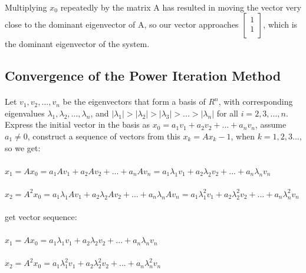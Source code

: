 \documentclass[12pt]{article}
\begin{document}
\paragraph{}Multiplying $x_0$ repeatedly by the matrix A has resulted in moving the vector very close to the dominant eigenvector of A, so our vector approaches $\begin{bmatrix}1\\1 \\\end{bmatrix}$, which is the dominant eigenvector of the system.

\subsection{Convergence of the Power Iteration Method}
\paragraph{}Let $v_1, v_2,..., v_n$ be the eigenvectors that form a basis of $R^n$, with corresponding eigenvalues $\lambda_1, \lambda_2, ..., \lambda_n$, and $|\lambda_1|>|\lambda_2|>|\lambda_3|>...>|\lambda_n|$ for all $i=2,3,...,n$. Express the initial vector in the basis as $x_0 = a_1v_1 + a_2v_2+ ... +a_nv_n$, assume $a_1\neq0$, construct a sequence of vectors from this $x_k = Ax_k-1$, when $k=1,2,3...$, so we get:
\paragraph{} $x_1 = Ax_0 = a_1Av_1 + a_2Av_2 + ... + a_nAv_n = a_1\lambda_1v_1 + a_2\lambda_2v_2+...+a_n\lambda_nv_n$
\paragraph{} $x_2 = A^2x_0 = a_1\lambda_1Av_1 + a_2\lambda_2Av_2+...+a_n\lambda_nAv_n = a_1\lambda_1^2v_1 + a_2\lambda_2^2v_2+...+a_n\lambda_n^2v_n$

\paragraph{}get vector sequence:
\paragraph{}$x_1 =Ax_0 = a_1\lambda_1v_1 + a_2\lambda_2v_2+...+a_n\lambda_nv_n$
\paragraph{}$x_2 =A^2x_0= a_1\lambda_1^2v_1 + a_2\lambda_2^2v_2+...+a_n\lambda_n^2v_n$
\end{document}
